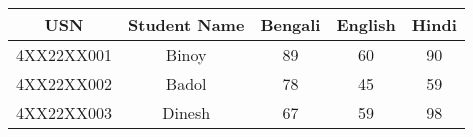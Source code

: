 \documentclass{article}
\begin{document}
\begin{tabular}{|c|c|c|c|c|}
\hline
USN & Student Name & Bengali & English & Hindi \\
\hline
4XX22XX001 & Binoy & 89 & 60 & 90 \\
4XX22XX002 & Badol & 78 & 45 & 59 \\
4XX22XX003 & Dinesh & 67 & 59 & 98 \\
\hline
\end{tabular}
\end{document}

